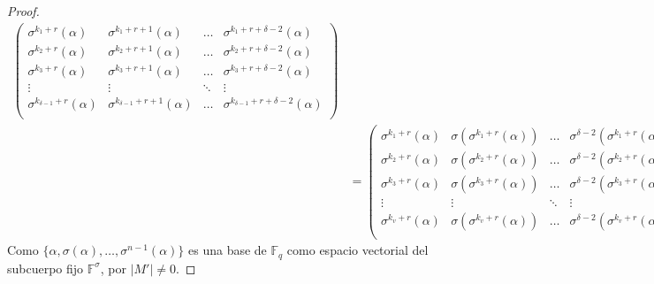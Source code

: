 \begin{proof}
\begin{align*}
\begin{pmatrix}
      \sigma^{k_1 + r}(\alpha) & \sigma^{k_1 + r + 1}(\alpha) & \dots & \sigma^{k_1 + r + \delta - 2}(\alpha)\\ 
      \sigma^{k_2 + r}(\alpha) & \sigma^{k_2 + r + 1}(\alpha) & \dots & \sigma^{k_2 + r + \delta - 2}(\alpha)\\ 
      \sigma^{k_3 + r}(\alpha) & \sigma^{k_3 + r + 1}(\alpha) & \dots & \sigma^{k_3 + r + \delta - 2}(\alpha)\\ 
      \vdots & \vdots & \ddots & \vdots\\ 
      \sigma^{k_{\delta - 1} + r}(\alpha) & \sigma^{k_{\delta - 1} + r + 1}(\alpha) & \dots & \sigma^{k_{\delta - 1} + r + \delta - 2}(\alpha)\\ 
     \end{pmatrix}\\
     &= \begin{pmatrix}
      \sigma^{k_1 + r}(\alpha) & \sigma(\sigma^{k_1 + r}(\alpha)) & \dots & \sigma^{\delta - 2}(\sigma^{k_1 + r}(\alpha))\\ 
      \sigma^{k_2 + r}(\alpha) & \sigma(\sigma^{k_2 + r}(\alpha)) & \dots & \sigma^{\delta - 2}(\sigma^{k_2 + r}(\alpha))\\ 
      \sigma^{k_3 + r}(\alpha) & \sigma(\sigma^{k_3 + r}(\alpha)) & \dots & \sigma^{\delta - 2}(\sigma^{k_3 + r}(\alpha))\\ 
      \vdots & \vdots & \ddots & \vdots\\ 
      \sigma^{k_v + r}(\alpha) & \sigma(\sigma^{k_v + r}(\alpha)) & \dots & \sigma^{\delta - 2}(\sigma^{k_v + r}(\alpha))\\ 
     \end{pmatrix}.
  \end{align*}
  Como \(\{\alpha, \sigma(\alpha), \dots, \sigma^{n-1}(\alpha)\}\) es una base de \(\mathbb F_q\) como espacio vectorial del subcuerpo fijo \(\mathbb F^{\sigma}\), por \parencite[Lema 2.1]{gomez-torrecillas_petersongorensteinzierler_2018} \(|M'| \neq 0\).
\end{proof}